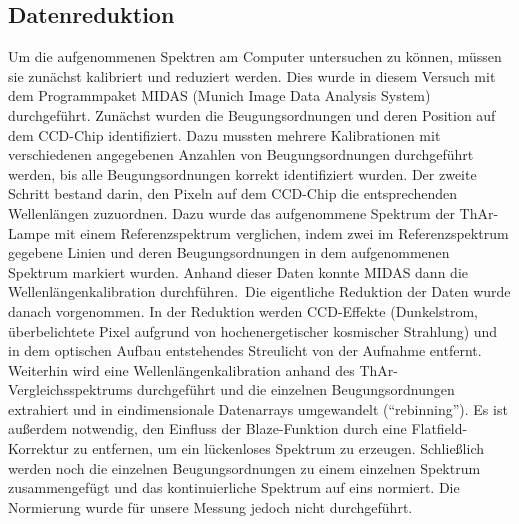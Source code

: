 \subsection{Datenreduktion}
Um die aufgenommenen Spektren am Computer untersuchen zu können, müssen sie zunächst kalibriert und reduziert werden. Dies wurde in diesem Versuch mit dem Programmpaket MIDAS (Munich Image Data Analysis System) durchgeführt. Zunächst wurden die Beugungsordnungen und deren Position auf dem CCD-Chip identifiziert. Dazu mussten mehrere Kalibrationen mit verschiedenen angegebenen Anzahlen von Beugungsordnungen durchgeführt werden, bis alle Beugungsordnungen korrekt identifiziert wurden. Der zweite Schritt bestand darin, den Pixeln auf dem CCD-Chip die entsprechenden Wellenlängen zuzuordnen. Dazu wurde das aufgenommene Spektrum der ThAr-Lampe mit einem Referenzspektrum verglichen, indem zwei im Referenzspektrum gegebene Linien und deren Beugungsordnungen in dem aufgenommenen Spektrum markiert wurden. Anhand dieser Daten konnte MIDAS dann die Wellenlängenkalibration durchführen.\
Die eigentliche Reduktion der Daten wurde danach vorgenommen. In der Reduktion werden CCD-Effekte (Dunkelstrom, überbelichtete Pixel aufgrund von hochenergetischer kosmischer Strahlung) und in dem optischen Aufbau entstehendes Streulicht von der Aufnahme entfernt. Weiterhin wird eine Wellenlängenkalibration anhand des ThAr-Vergleichsspektrums durchgeführt und die einzelnen Beugungsordnungen extrahiert und in eindimensionale Datenarrays umgewandelt (\enquote{rebinning}). Es ist außerdem notwendig, den Einfluss der Blaze-Funktion durch eine Flatfield-Korrektur zu entfernen, um ein lückenloses Spektrum zu erzeugen. Schließlich werden noch die einzelnen Beugungsordnungen zu einem einzelnen Spektrum zusammengefügt und das kontinuierliche Spektrum auf eins normiert. Die Normierung wurde für unsere Messung jedoch nicht durchgeführt.  
